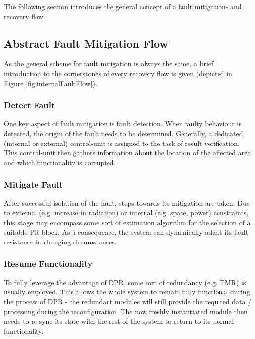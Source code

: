 The following section introduces the general concept of a fault mitigation- and recovery flow. 

\subsection{Abstract Fault Mitigation Flow}\label{AbstractFaultMitigationFlow}
As the general scheme for fault mitigation is always the same, a brief introduction to the cornerstones of every recovery flow is given (depicted in Figure \ref{fig:internalFaultFlow}). 

\subsubsection{Detect Fault}
    One key aspect of fault mitigation is fault detection. 
    When faulty behaviour is detected, the origin of the fault needs to be determined.
    Generally, a dedicated (internal or external) control-unit is assigned to the task of result verification.
    This control-unit then gathers information about the location of the affected area and which functionality is corrupted.
\subsubsection{Mitigate Fault}
    After successful isolation of the fault, steps towards its mitigation are taken.
    Due to external (e.g. increase in radiation) or internal (e.g. space, power) constraints, this stage may encompass some sort of estimation algorithm for the selection of a suitable \gls{PR} block.
    As a consequence, the system can dynamically adapt its fault resistance to changing circumstances.
\subsubsection{Resume Functionality}
    To fully leverage the advantage of \gls{DPR}, some sort of redundancy (e.g. \gls{TMR}) is usually employed.
    This allows the whole system to remain fully functional during the process of \gls{DPR} - the redundant modules will still provide the required data / processing during the reconfiguration. 
    The now freshly instantiated module then needs to re-sync its state with the rest of the system to return to its normal functionality.
